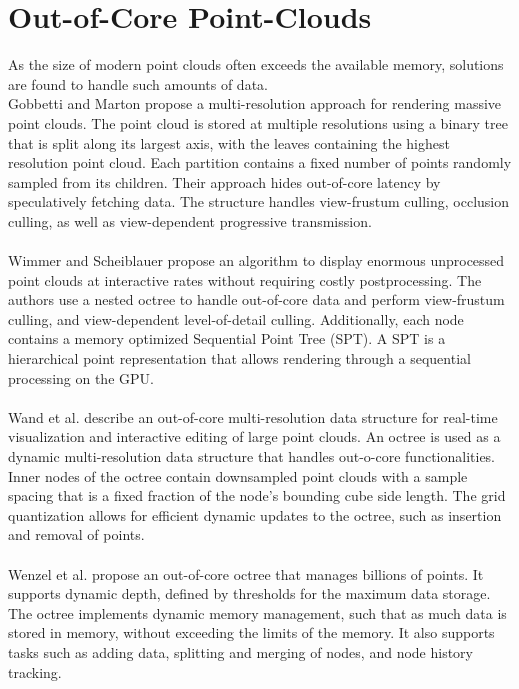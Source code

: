 \section {Out-of-Core Point-Clouds}
\label{sec:related_work_point_clouds}
As the size of modern point clouds often exceeds the available memory, solutions are found to handle such amounts of data. 
\\
Gobbetti and Marton \cite{gobbetti2004layered} propose a multi-resolution approach for rendering massive point clouds. The point cloud is stored at multiple resolutions using a binary tree that is split along its largest axis, with the leaves containing the highest resolution point cloud. Each partition contains a fixed number of points randomly sampled from its children. Their approach hides out-of-core latency by speculatively fetching data. The structure handles view-frustum culling, occlusion culling, as well as view-dependent progressive transmission.
\\
\\
Wimmer and Scheiblauer \cite{wimmer2006instant} propose an algorithm to display enormous unprocessed point clouds at interactive rates without requiring costly postprocessing. The authors use a nested octree to handle out-of-core data and perform view-frustum culling, and view-dependent level-of-detail culling. Additionally, each node contains a memory optimized Sequential Point Tree (SPT). A SPT is a hierarchical point representation that allows rendering through a sequential processing on the GPU.  
\\
\\
Wand et al. \cite{wand2007interactive} describe an out-of-core multi-resolution data structure for real-time visualization and interactive editing of large point clouds. An octree is used as a dynamic multi-resolution data structure that handles out-o-core functionalities. Inner nodes of the octree contain downsampled point clouds with a sample spacing that is a fixed fraction of the node's bounding cube side length. The grid quantization allows for efficient dynamic updates to the octree, such as insertion and removal of points. 
\\
\\
Wenzel et al.  \cite{wenzel2014out} propose an out-of-core octree that manages billions of points. It supports dynamic depth, defined by thresholds for the maximum data storage. The octree implements dynamic memory management, such that as much data is stored in memory, without exceeding the limits of the memory. It also supports tasks such as adding data, splitting and merging of nodes, and node history tracking. 
